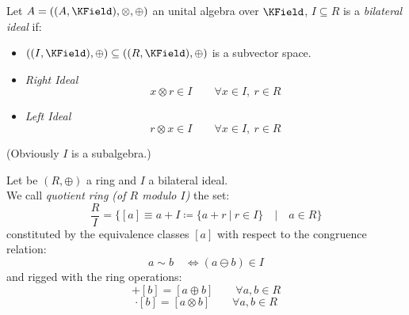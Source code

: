 \documentclass[a4paper,12pt]{scrartcl}    %
\begin{document}
			\begin{definition}
				Let $A= ((A,\KField), \otimes, \oplus)$ an unital algebra over $\KField$, $ I\subseteq R$ is a \emph{bilateral ideal} if:
				\begin{itemize}
					\item 	$((I, \KField),\oplus) \subseteq ( (R, \KField), \oplus)$ is a subvector space.
					\item \emph{Right Ideal}
						\begin{displaymath}
							x \otimes r \in I \qquad \forall x \in I , \: r \in R
						\end{displaymath}									
					\item \emph{Left Ideal}
						\begin{displaymath}
							r \otimes x \in I \qquad \forall x \in I , \: r \in R
						\end{displaymath}									
				\end{itemize}
				(Obviously $I$ is a subalgebra.)				
			\end{definition}
			
			\begin{remark}
				Let be $(R, \oplus)$ a ring and $I$ a bilateral ideal.\\
				We call \emph{quotient ring (of $R$ modulo $I$)} the set:
				\begin{displaymath}
					\frac{R}{I}= \big\{[a] \equiv a + I \coloneqq \{a+r \: \vert \: r \in I\}\quad \big\vert\quad  a \in R\big\}
				\end{displaymath}
				constituted by the equivalence classes $[a]$ with respect to the congruence relation:
				\begin{displaymath}
					a \sim b \quad \Leftrightarrow (a \ominus b) \in I
				\end{displaymath}
				and rigged with the ring operations:
				\begin{displaymath}
					[a]+[b] = [ a \oplus b] \qquad \forall a,b \in R
				\end{displaymath}
				\begin{displaymath}
					[a]\cdot[b] = [ a \otimes b] \qquad \forall a,b \in R
				\end{displaymath}
			\end{remark}
			
			\begin{definition}
				
			\end{definition}
\end{document}
